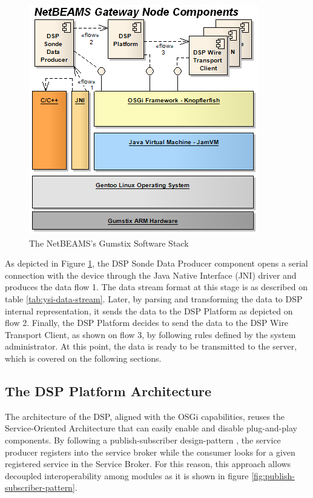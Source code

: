 \begin{figure}[h]
  \centering
  \includegraphics[scale=0.6]{../diagrams/NetBEAMS-Client-Node-Components}
  \caption{The NetBEAMS's Gumstix Software Stack}
  \label{fig:netbeams-software-stack}
\end{figure}

As depicted in Figure \ref{fig:netbeams-software-stack}, the DSP Sonde Data
Producer component opens a serial connection with the device through the Java
Native Interface (JNI) driver and produces the data flow 1. The data stream
format at this stage is as described on table \ref{tab:ysi-data-stream}.
Later, by parsing and transforming the data to DSP internal representation, it
sends the data to the DSP Platform as depicted on flow 2. Finally, the DSP
Platform decides to send the data to the DSP Wire Transport Client, as shown
on flow 3, by following rules defined by the system administrator. At this
point, the data is ready to be transmitted to the server, which is covered on
the following sections.

\subsection{The DSP Platform Architecture}
\label{sec:netbeams-architecture}

The architecture of the DSP, aligned with the OSGi capabilities, reuses the
Service-Oriented Architecture that can easily enable and disable plug-and-play
components. By following a publish-subscriber design-pattern \cite{gof}, the
service producer registers into the service broker while the consumer looks
for a given registered service in the Service Broker. For this reason, this
approach allows decoupled interoperability among modules as it is shown in
figure \ref{fig:publish-subscriber-pattern}.

